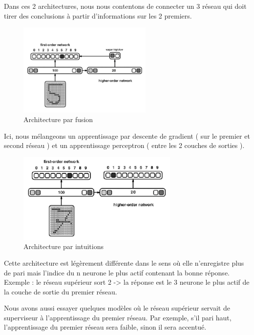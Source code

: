 \documentclass[a4paper,12pt]{article}
\begin{document}
Dans ces 2 architectures, nous nous contentons de connecter un 3 réseau qui doit 
tirer des conclusions à partir d'informations sur les 2 premiers.

\begin{figure}[h]
 \begin{center}
 \includegraphics[width=250px]{../pre-presentation/merging.png}
\end{center}
\caption{Architecture par fusion}
\end{figure}

Ici, nous mélangeons un apprentissage par descente de gradient ( sur le premier et second réseau )
et un apprentissage perceptron ( entre les 2 couches de sorties ).

\begin{figure}[h]
 \begin{center}
 \includegraphics[width=300px]{../pre-presentation/nth_wta.png}
\end{center}
\caption{Architecture par intuitions}
\end{figure}

Cette architecture est légèrement différente dans le sens où elle n'enregistre
plus de pari mais l'indice du n neurone le plus actif contenant la bonne réponse.
Exemple : le réseau supérieur sort 2 -> la réponse est le 3 neurone le plus actif 
de la couche de sortie du premier réseau.
\newline

Nous avons aussi essayer quelques modèles où le réseau supérieur servait de superviseur
à l'apprentissage du premier réseau. Par exemple, s'il pari haut, l'apprentissage du premier réseau
sera faible, sinon il sera accentué.
\end{document}
